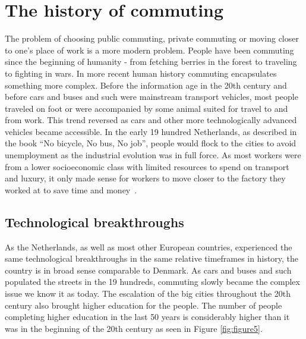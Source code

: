 \section{The history of commuting}\label{sec:the-history-of-commuting}

The problem of choosing public commuting, private commuting or moving closer to one's place of work is a more modern
problem.
People have been commuting since the beginning of humanity - from fetching berries in the forest to traveling to
fighting in wars.
In more recent human history commuting encapsulates something more complex.
Before the information age in the 20th century and before cars and buses and such were mainstream transport vehicles,
most people traveled on foot or were accompanied by some animal suited for travel to and from work.
This trend reversed as cars and other more technologically advanced vehicles became accessible.
In the early 19 hundred Netherlands, as described in the book ``No bicycle, No bus, No job'', people would flock to the
cities to avoid unemployment as the industrial evolution was in full force.
As most workers were from a lower socioeconomic class with limited resources to spend on transport and luxury, it only
made sense for workers to move closer to the factory they worked at to save time and money~\cite{bek2022}.

\subsection{Technological breakthroughs}\label{subsec:technological-breakthroughs}

As the Netherlands, as well as most other European countries, experienced the same technological breakthroughs in the
same relative timeframes in history, the country is in broad sense comparable to Denmark.
As cars and buses and such populated the streets in the 19 hundreds, commuting slowly became the complex issue we
know it as today.
The escalation of the big cities throughout the 20th century also brought higher education for the people.
The number of people completing higher education in the last 50 years is considerably higher than it was in the
beginning of the 20th century as seen in Figure \ref{fig:figure5}.


